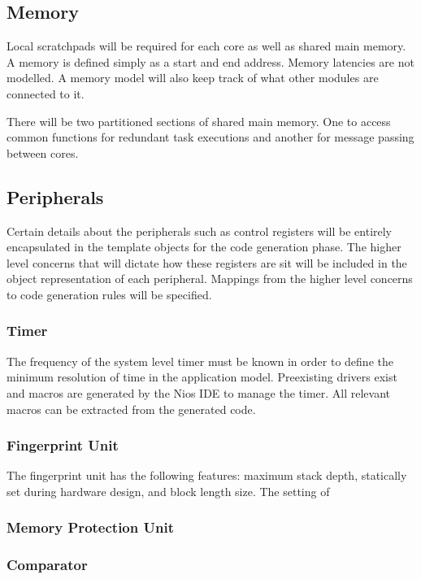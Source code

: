 \documentclass[table,11pt]{article}
\begin{document}
\subsection{Memory}
Local scratchpads will be required for each core as well as shared main memory. A memory is defined simply as a start and end address. Memory latencies are not modelled. A memory model will also keep track of what other modules are connected to it.

There will be two partitioned sections of shared main memory. One to access common functions for redundant task executions and another for message passing between cores.

\subsection{Peripherals}
Certain details about the peripherals such as control registers will be entirely encapsulated in the template objects for the code generation phase. The higher level concerns that will dictate how these registers are sit will be included in the object representation of each peripheral. Mappings from the higher level concerns to code generation rules will be specified.

\subsubsection{Timer}
The frequency of the system level timer must be known in order to define the minimum resolution of time in the application model. Preexisting drivers exist and macros are generated by the Nios IDE to manage the timer. All relevant macros can be extracted from the generated code.

\subsubsection{Fingerprint Unit} 
The fingerprint unit has the following features: maximum stack depth, statically set during hardware design, and block length size. The setting of

\subsubsection{Memory Protection Unit}

\subsubsection{Comparator}
\end{document}
